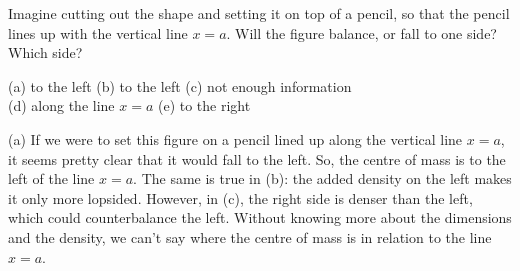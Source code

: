 \begin{hint}
Imagine cutting out the shape and setting it on top of a pencil, so that the pencil lines up with the vertical line $x=a$. Will the figure balance, or fall to one side? Which side?
\end{hint}
\begin{answer}
(a) to the left \qquad (b) to the left \qquad (c) not enough information\\
(d) along the line $x=a$ \qquad (e) to the right
\end{answer}
\begin{solution}
(a) If we were to set this figure on a pencil lined up along the vertical line $x=a$, it seems pretty clear that it would fall to the left. So, the centre of mass is to the left of the line $x=a$. The same is true in (b): the added density on the left makes it only more lopsided. However, in (c), the right side is denser than the left, which could counterbalance the left. Without knowing more about the dimensions and the density, we can't say where the centre of mass is in relation to the line $x=a$.


\end{solution}
